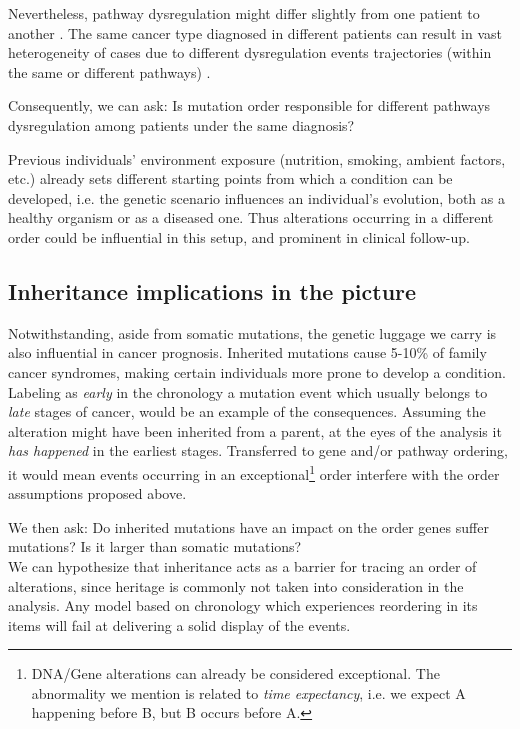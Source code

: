 Nevertheless, pathway dysregulation might differ slightly from one patient to another \cite{Ulitsky2010DEGAS:Diseases}. The same cancer type diagnosed in different patients can result in vast heterogeneity of cases due to different dysregulation events trajectories (within the same or different pathways) \cite{Khakabimamaghani2019UncoveringDysregulation}.

Consequently, we can ask: Is mutation order responsible for different pathways dysregulation among patients under the same diagnosis?

Previous individuals' environment exposure (nutrition, smoking, ambient factors, etc.) \cite{Jung2007EnvironmentalGenome} already sets different starting points from which a condition can be developed, i.e. the genetic scenario influences an individual’s evolution, both as a healthy organism or as a diseased one. Thus alterations occurring in a different order could be influential in this setup, and prominent in clinical follow-up.

\subsection{Inheritance implications in the picture}
Notwithstanding, aside from somatic mutations, the genetic luggage we carry is also influential in cancer prognosis. Inherited mutations cause 5-10\% of family cancer syndromes, making certain individuals more prone to develop a condition.
\\

Labeling as \textit{early} in the chronology a mutation event which usually belongs to \textit{late} stages of cancer,  would be an example of the consequences.  Assuming the alteration might have been inherited from a parent, at the eyes of the analysis it \textit{has happened} in the earliest stages. Transferred to gene and/or pathway ordering, it would mean events occurring in an exceptional\footnote{DNA/Gene alterations can already be considered exceptional. The abnormality we mention is related to \emph{time expectancy}, i.e. we expect A happening before B, but B occurs before A.} order interfere with the order assumptions proposed above.

We then ask: Do inherited mutations have an impact on the order genes suffer mutations? Is it larger than somatic mutations?
\\

We can hypothesize that inheritance acts as a barrier for tracing an order of alterations, since heritage is commonly not taken into consideration in the analysis. Any model based on chronology which experiences reordering in its items will fail at delivering a solid display of the events.